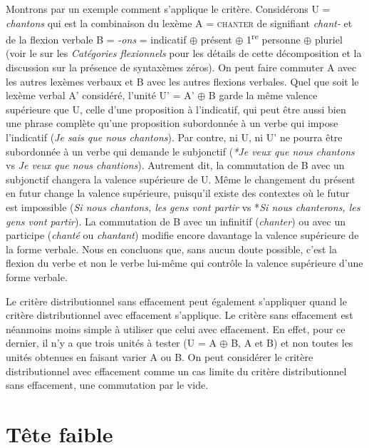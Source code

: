 Montrons par un exemple comment s’applique le critère. Considérons U = \textit{chantons} qui est la combinaison du lexème A = \textsc{chanter} de signifiant \textit{chant-} et de la flexion verbale B = \textit{{}-ons} = indicatif ${\oplus}$ présent ${\oplus}$ 1\textsuperscript{re} personne ${\oplus}$ pluriel (voir le  sur les \textit{Catégories flexionnels} pour les détails de cette décomposition et la discussion sur la présence de syntaxèmes zéros). On peut faire commuter A avec les autres lexèmes verbaux et B avec les autres flexions verbales. Quel que soit le lexème verbal A’ considéré, l’unité U’ =  A’ ${\oplus}$ B garde la même valence supérieure que U, celle d’une proposition à l’indicatif, qui peut être aussi bien une phrase complète qu’une proposition subordonnée à un verbe qui impose l’indicatif (\textit{Je sais que nous chantons}). Par contre, ni U, ni U’ ne pourra être subordonnée à un verbe qui demande le subjonctif (\textit{*Je veux que nous chantons} vs \textit{Je veux que nous chantions}). Autrement dit, la commutation de B avec un subjonctif changera la valence supérieure de U. Même le changement du présent en futur change la valence supérieure, puisqu’il existe des contextes où le futur est impossible (\textit{Si nous chantons, les gens vont partir} vs *\textit{Si nous chanterons, les gens vont partir}). La commutation de B avec un infinitif (\textit{chanter}) ou avec un participe (\textit{chanté} ou \textit{chantant}) modifie encore davantage la valence supérieure de la forme verbale. Nous en concluons que, sans aucun doute possible, c’est la flexion du verbe et non le verbe lui-même qui contrôle la valence supérieure d’une forme verbale.

Le critère distributionnel sans effacement peut également s’appliquer quand le critère distributionnel avec effacement s’applique. Le critère sans effacement est néanmoins moins simple à utiliser que celui avec effacement. En effet, pour ce dernier, il n’y a que trois unités à tester (U = A ${\oplus}$ B, A et B) et non toutes les unités obtenues en faisant varier A ou B. On peut considérer le critère distributionnel avec effacement comme un cas limite du critère distributionnel sans effacement, une commutation par le vide.

\section{ Tête faible}\label{sec:3.3.14}

